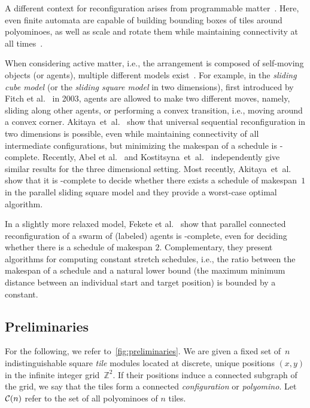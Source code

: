 A different context for reconfiguration arises from
programmable matter~\cite{gmyr2018recognition,gmyr2020forming,hinnenthal2024efficient}.
Here, even finite automata are capable of building bounding boxes of tiles
around polyominoes, as well as scale and rotate them while maintaining
connectivity at all times~\cite{fekete2022connected,NiesReconfig}.

When considering active matter, i.e., the arrangement is composed of self-moving objects (or agents), multiple different models exist~\cite{almethen2020pushing,almethen2022efficient,connor2025transformation,michail2019transformation}.
For example, in the \emph{sliding cube model} (or the \emph{sliding square model} in two dimensions), first introduced by Fitch et al.~\cite{FitchBR03,FitchBR05} in 2003, agents are allowed to make two different moves, namely, sliding along other agents, or performing a convex transition, i.e., moving around a convex corner.
Akitaya~et~al.~\cite{AkitayaDKKPSSUW22} show that universal sequential reconfiguration in two dimensions is possible, even while maintaining connectivity of all intermediate configurations, but minimizing the makespan of a schedule is \NP-complete.
Recently, Abel et al.~\cite{AbelAKKS24} and Kostitsyna~et~al.~\cite{KostitsynaOPPSS24} independently give similar results for the three dimensional setting.
Most recently, Akitaya~et~al.~\cite{parallel-sliding-squares} show that it is \NP-complete to decide whether there exists a schedule of makespan~$1$ in the parallel sliding square model and they provide a worst-case optimal algorithm.

In a slightly more relaxed model, Fekete et al.~\cite{FeketeKKRS23-journal-connected,FeketeKRS022-journal-labeled-connected} show that parallel connected reconfiguration of a swarm of (labeled) agents is \NP-complete, even for deciding whether there is a schedule of makespan $2$.
Complementary, they present algorithms for computing constant stretch schedules, i.e., the ratio between the makespan of a schedule and a natural lower bound (the maximum minimum distance between an individual start and target position) is bounded by a constant.


\subsection{Preliminaries}
\label{subsec:preliminaries}

For the following, we refer to~\cref{fig:preliminaries}.
We are given a fixed set of~$n$ indistinguishable square \emph{tile} modules located at discrete, unique positions $(x,y)$ in the infinite integer grid~$\mathbb{Z}^2$.
If their positions induce a connected subgraph of the grid, we say that the tiles form a connected \emph{configuration} or \emph{polyomino}.
Let~$\mathcal{C}(n)$ refer to the set of all polyominoes of $n$ tiles.

